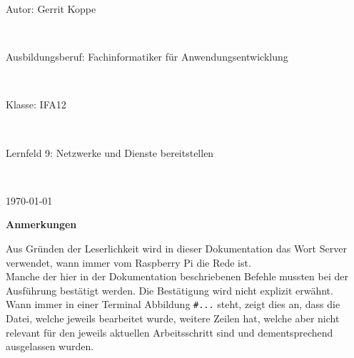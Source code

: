 \documentclass[a4paper, 11pt]{scrartcl}
\begin{document}
\begin{center}
    \vspace{0.1\textheight}
    \begin{Large}
        Autor: Gerrit Koppe
    \end{Large}
    \\
    \vspace{0.5cm}
    \begin{Large}
        Ausbildungsberuf: Fachinformatiker für Anwendungsentwicklung
    \end{Large}
    \\
    \vspace{0.5cm}
    \begin{Large}
        Klasse: IFA12
    \end{Large}
    \\
    \vspace{0.5cm}
    \begin{Large}
        Lernfeld 9: Netzwerke und Dienste bereitstellen
    \end{Large}
    \\
    \vspace{0.5cm}
    \begin{Large}
        \today
    \end{Large}
\end{center}
\newpage
\thispagestyle{empty}
\begin{Large}
    \begin{flushleft}
        \textbf{\textcolor{BBS}{Anmerkungen}}
    \end{flushleft}
\end{Large}
Aus Gründen der Leserlichkeit wird in dieser Dokumentation das Wort \glqq Server\grqq{} verwendet, wann immer vom Raspberry Pi die Rede ist.
\\
Manche der hier in der Dokumentation beschriebenen Befehle mussten bei der Ausführung bestätigt werden. Die Bestätigung wird nicht explizit
erwähnt.
\\
Wann immer in einer Terminal Abbildung \glqq\lstinline[basicstyle={\small\ttfamily\color{black}}]|#...|\grqq{} steht, zeigt dies an, dass die Datei, welche jeweils bearbeitet wurde,
weitere Zeilen hat, welche aber nicht relevant für den jeweils aktuellen Arbeitsschritt sind und dementsprechend ausgelassen wurden.

\newpage
\thispagestyle{empty}
\tableofcontents
\newpage
\clearpage
{}
\end{document}

